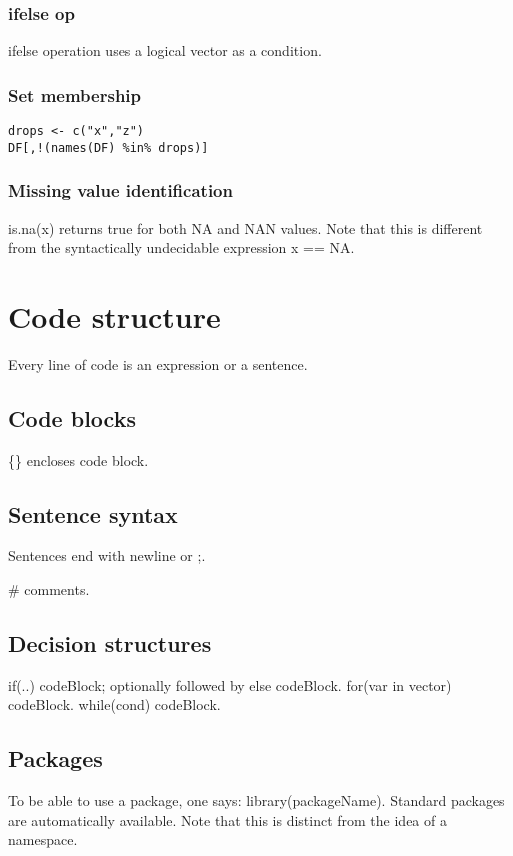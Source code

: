 \documentclass[oneside, article]{memoir}
\begin{document}
\subsubsection{ifelse op}
ifelse operation uses a logical vector as a condition.

\subsubsection{Set membership}
\begin{verbatim}
drops <- c("x","z")
DF[,!(names(DF) %in% drops)]
\end{verbatim}


\subsubsection{Missing value identification}
is.na(x) returns true for both NA and NAN values. Note that this is different from the syntactically undecidable expression x == NA.



\section{Code structure}
Every line of code is an expression or a sentence.

\subsection{Code blocks}
\{\} encloses code block.

\subsection{Sentence syntax}
Sentences end with newline or ;.

\# comments.

\subsection{Decision structures}
if(..) codeBlock; optionally followed by else codeBlock. for(var in vector) codeBlock. while(cond) codeBlock.

\subsection{Packages}
To be able to use a package, one says: library(packageName). Standard packages are automatically available. Note that this is distinct from the idea of a namespace.
\end{document}
